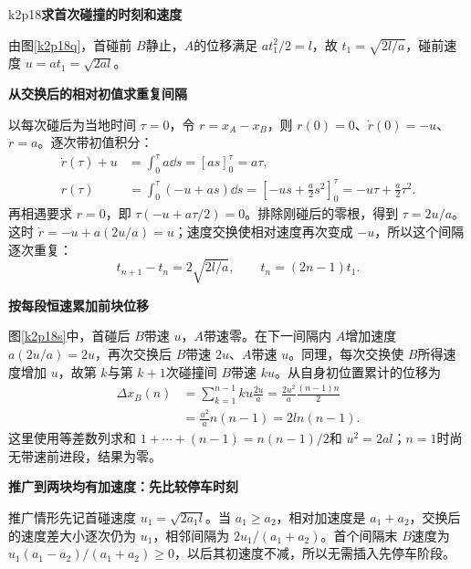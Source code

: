 \begin{drillsolution}{k2p18}\textbf{求首次碰撞的时刻和速度}\par\nobreak
由图\ref{k2p18q}，首碰前 $B$静止，$A$的位移满足 $at_1^2/2=l$，故 $t_1=\sqrt{2l/a}$，碰前速度 $u=at_1=\sqrt{2al}$。

\par\medskip{}\noindent\textbf{从交换后的相对初值求重复间隔}\par\nobreak
以每次碰后为当地时间 $\tau=0$，令 $r=x_A-x_B$，则 $r(0)=0$、$\dot r(0)=-u$、$\ddot r=a$。逐次带初值积分：
\begin{align*}
 \dot r(\tau)+u&=\int_0^\tau a\dd s=[as]_0^\tau=a\tau,\\
 r(\tau)&=\int_0^\tau(-u+as)\dd s
 =\left[-us+\frac a2s^2\right]_0^\tau
 =-u\tau+\frac a2\tau^2.
\end{align*}
再相遇要求 $r=0$，即 $\tau(-u+a\tau/2)=0$。排除刚碰后的零根，得到 $\tau=2u/a$。这时 $\dot r=-u+a(2u/a)=u$；速度交换使相对速度再次变成 $-u$，所以这个间隔逐次重复：
\[\boxed{t_{n+1}-t_n=2\sqrt{2l/a}},\qquad t_n=(2n-1)t_1.
\]



\par\medskip{}\noindent\textbf{按每段恒速累加前块位移}\par\nobreak
图\ref{k2p18s}中，首碰后 $B$带速 $u$，$A$带速零。在下一间隔内 $A$增加速度 $a(2u/a)=2u$，再次交换后 $B$带速 $2u$、$A$带速 $u$。同理，每次交换使 $B$所得速度增加 $u$，故第 $k$与第 $k+1$次碰撞间 $B$带速 $ku$。从自身初位置累计的位移为
\begin{align*}
 \Delta x_B(n)&=\sum_{k=1}^{n-1}ku\frac{2u}{a}
 =\frac{2u^2}{a}\frac{(n-1)n}{2}\\
 &=\frac{u^2}{a}n(n-1)=\boxed{2ln(n-1)}.
\end{align*}
这里使用等差数列求和 $1+\cdots+(n-1)=n(n-1)/2$和 $u^2=2al$；$n=1$时尚无带速前进段，结果为零。


\par\medskip{}\noindent\textbf{推广到两块均有加速度：先比较停车时刻}\par\nobreak
推广情形先记首碰速度 $u_1=\sqrt{2a_1l}$。当 $a_1\ge a_2$，相对加速度是 $a_1+a_2$，交换后的速度差大小逐次仍为 $u_1$，相邻间隔为 $2u_1/(a_1+a_2)$。首个间隔末 $B$速度为 $u_1(a_1-a_2)/(a_1+a_2)\ge0$，以后其初速度不减，所以无需插入先停车阶段。




\end{drillsolution}
